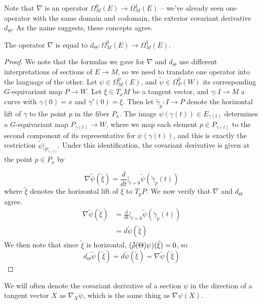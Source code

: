 %
Note that $\nabla$ is an operator $\Omega_M^0(E) \to \Omega^1_M(E)$ --
we've already seen one operator with the same domain and codomain, the
exterior covariant derivative $d_\Theta$. As the name suggests, these
concepts agree.
%
\begin{prop}
The operator $\nabla$ is equal to $d_\Theta : \Omega_M^0(E) \to \Omega_M^1(E)$.
\end{prop}
%
\begin{proof}
We note that the formulas we gave for $\nabla$ and $d_\Theta$ use different
interpretations of sections of $E \to M$, so we need to translate one
operator into the language of the other. Let $\psi \in \Omega^0_M(E)$,
and $\tilde{\psi} \in \Omega^0_P(W)$ its corresponding $G$-equivariant map
$P \to W$. Let $\xi \in T_xM$ be a tangent vector, and $\gamma : I \to M$
a curve with $\gamma(0) = x$ and $\gamma'(0) = \xi$. Then let
$\tilde{\gamma}_p : I \to P$ denote the horizontal lift of $\gamma$ to the point
$p$ in the fiber $P_x$. The image $\psi(\gamma(t)) \in E_{\gamma(t)}$ determines
a $G$-equivariant map $P_{\gamma(t)} \to W$, where we map each element
$p \in P_{\gamma(t)}$ to the second component of its representative for
$\psi(\gamma(t))$, and this is exactly the restriction
$\tilde{\psi}\vert_{P_{\gamma(t)}}$. Under this identification, the
covariant derivative is given at the point $p \in P_x$ by

\[
\nabla\tilde{\psi}(\tilde{\xi})
= \frac{d}{dt}\bigg\vert_{t=0} \tilde{\psi}(\tilde{\gamma}_p(t))
\]
where $\tilde{\xi}$ denotes the horizontal lift of $\xi$ to $T_pP$.
We now verify that $\nabla$ and $d_\Theta$ agree.
\begin{align*}
\nabla\tilde{\psi}(\tilde{\xi})
&= \frac{d}{dt}\bigg\vert_{t=0} \tilde{\psi}(\tilde{\gamma}_p(t)) \\
&= d\tilde{\psi}(\tilde{\xi})
\end{align*}
We then note that since $\tilde{\xi}$ is horizontal,
$(\accentset{\mbox{\large\bfseries .}}{\rho}(\Theta)\psi)(\tilde{\xi}) = 0$, so
\[
d_\Theta\tilde{\psi}(\tilde{\xi}) = d\tilde{\psi}(\tilde{\xi})
= \nabla\tilde{\psi}(\tilde{\xi})
\]
\end{proof}
%
We will often denote the covariant derivative of a section $\psi$ in the direction
of a tangent vector $X$ as $\nabla_X\psi$, which is the same thing as $\nabla\psi(X)$.
%















